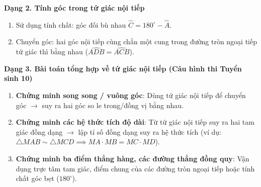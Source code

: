 \textbf{Dạng 2. Tính góc trong tứ giác nội tiếp}
\begin{enumerate}
\item Sử dụng tính chất: góc đối bù nhau $\widehat{C} = 180^\circ - \widehat{A}$.
\item Chuyển góc: hai góc nội tiếp cùng chắn một cung trong đường tròn ngoại tiếp tứ giác thì bằng nhau ($\widehat{ADB} = \widehat{ACB}$).
\end{enumerate}

\textbf{Dạng 3. Bài toán tổng hợp về tứ giác nội tiếp (Câu hình thi Tuyển sinh 10)}
\begin{enumerate}
\item \textbf{Chứng minh song song / vuông góc}: Dùng tứ giác nội tiếp để chuyển góc $\rightarrow$ suy ra hai góc so le trong/đồng vị bằng nhau.
\item \textbf{Chứng minh các hệ thức tích độ dài}: Từ tứ giác nội tiếp suy ra hai tam giác đồng dạng $\rightarrow$ lập tỉ số đồng dạng suy ra hệ thức tích (ví dụ: $\triangle MAB \sim \triangle MCD \implies MA \cdot MB = MC \cdot MD$).
\item \textbf{Chứng minh ba điểm thẳng hàng, các đường thẳng đồng quy}: Vận dụng trực tâm tam giác, điểm chung của các đường tròn ngoại tiếp hoặc tính chất góc bẹt ($180^\circ$).
\end{enumerate}
